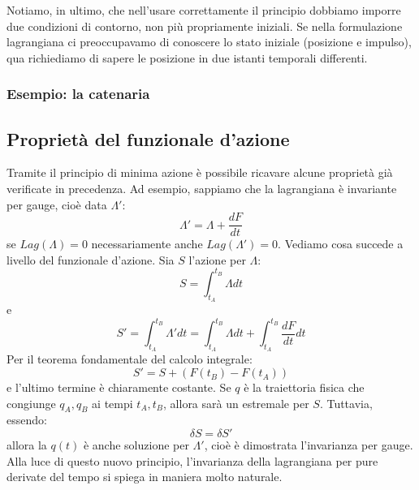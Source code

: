 \documentclass[a4paper,openany]{article}
\begin{document}
	Notiamo, in ultimo, che nell'usare correttamente il principio dobbiamo imporre due condizioni di contorno, non più propriamente iniziali. Se nella formulazione lagrangiana ci preoccupavamo di conoscere lo stato iniziale (posizione e impulso), qua richiediamo di sapere le posizione in due istanti temporali differenti.
	\subsubsection{Esempio: la catenaria}
	\subsection{Proprietà del funzionale d'azione}
	Tramite il principio di minima azione è possibile ricavare alcune proprietà già verificate in precedenza. Ad esempio, sappiamo che la lagrangiana è invariante per gauge, cioè data $\Lambda'$:
	$$
	\Lambda' = \Lambda + \dfrac{dF}{dt}
	$$
	se $Lag(\Lambda)=0$ necessariamente anche $Lag(\Lambda')=0$. Vediamo cosa succede a livello del funzionale d'azione.
	Sia $S$ l'azione per $\Lambda$:
	$$
	S = \int_{t_A}^{t_B} \Lambda dt
	$$
	e 
	$$
	S' = \int_{t_A}^{t_B} \Lambda' dt = \int_{t_A}^{t_B} \Lambda dt + \int_{t_A}^{t_B} \dfrac{dF}{dt} dt
	$$
	Per il teorema fondamentale del calcolo integrale:
	$$
	S' = S + (F(t_B)-F(t_A))
	$$
	e l'ultimo termine è chiaramente costante. Se $q$ è la traiettoria fisica che congiunge $q_A, q_B$ ai tempi $t_A, t_B$, allora sarà un estremale per $S$. Tuttavia, essendo:
	$$
	\delta S = \delta S'
	$$
	allora la $q(t)$ è anche soluzione per $\Lambda'$, cioè è dimostrata l'invarianza per gauge. Alla luce di questo nuovo principio, l'invarianza della lagrangiana per pure derivate del tempo si spiega in maniera molto naturale.
\end{document}
